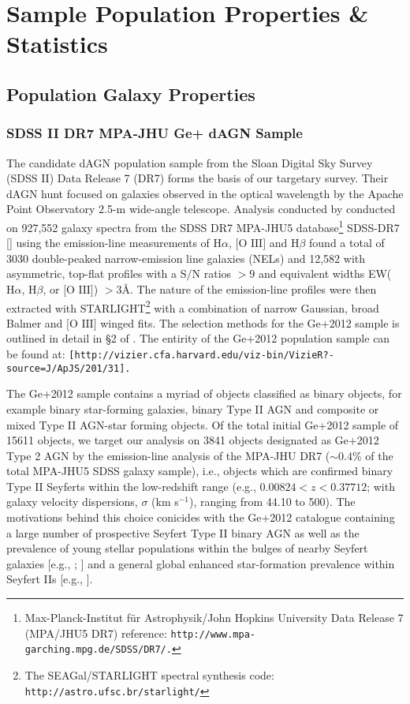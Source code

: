 \section{Sample Population Properties \& Statistics}
\subsection{Population Galaxy Properties}
\subsubsection{SDSS II DR7 MPA-JHU Ge+ dAGN Sample}

The \cite{Ge_Hu_Wang_Bai_Zhang_2012} candidate dAGN population sample from the Sloan Digital Sky Survey (SDSS II) Data Release 7 (DR7) forms the basis of our targetary survey. Their dAGN hunt focused on galaxies observed in the optical wavelength by the Apache Point Observatory 2.5-m wide-angle telescope. Analysis conducted by \cite{Ge_Hu_Wang_Bai_Zhang_2012} conducted on 927,552 galaxy spectra from the SDSS DR7 MPA-JHU5 database\footnote{\tiny{Max-Planck-Institut für Astrophysik/John Hopkins University Data Release 7 (MPA/JHU5 DR7) reference: \tt{http://www.mpa-garching.mpg.de/SDSS/DR7/}.}} SDSS-DR7 [\cite{2009ApJS..182..543A}] using the emission-line measurements of $\text{H}\alpha$, $\text{[O III]}$ and $\text{H}\beta$ found a total of 3030 double-peaked narrow-emission line galaxies (NELs) and 12,582 with asymmetric, top-ﬂat proﬁles with a $\text{S/N}$ ratios ${>}{9}$ and equivalent widths EW($\text{H}\alpha$, $\text{H}\beta$, or $\text{[O III]}$) ${>}{3}$\AA. The nature of the emission-line profiles were then extracted with STARLIGHT\footnote{\tiny{The SEAGal/STARLIGHT spectral synthesis code: \tt{http://astro.ufsc.br/starlight/}}} with a combination of narrow Gaussian, broad Balmer and $\text{[O III]}$ winged fits. The selection methods for the Ge+2012 sample is outlined in detail in §2 of \cite{Ge_Hu_Wang_Bai_Zhang_2012}. The entirity of the Ge+2012 population sample can be found at: \tt{[http://vizier.cfa.harvard.edu/viz-bin/VizieR?-source=J/ApJS/201/31]}.

The Ge+2012 sample contains a myriad of objects classified as binary objects, for example binary star-forming galaxies, binary Type II AGN and composite or mixed Type II AGN-star forming objects. Of the total initial Ge+2012 sample of 15611 objects, we target our analysis on 3841 objects designated as Ge+2012 Type 2 AGN by the emission-line analysis of the MPA-JHU DR7 ($\sim{0.4}$\% of the total MPA-JHU5 SDSS galaxy sample), i.e., objects which are confirmed binary Type II Seyferts within the low-redshift range (e.g., $0.00824{<}z{<}0.37712$; with galaxy velocity dispersions, $\sigma$ (km s$^{-1}$), ranging from 44.10 to 500). The motivations behind this choice conicides with the Ge+2012 catalogue containing a large number of prospective Seyfert Type II binary AGN as well as the prevalence of young stellar populations within the bulges of nearby Seyfert galaxies [e.g., \cite{1990MNRAS.242..271T}; \cite{Delgado_2001}] and a general global enhanced star-formation prevalence within Seyfert IIs [e.g., \cite{2006MNRAS.366..480G}].  

